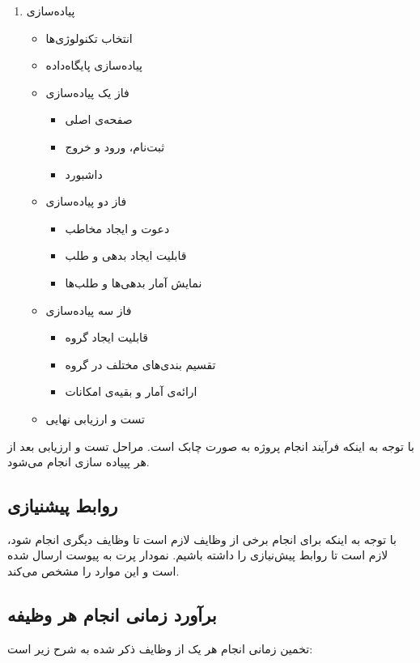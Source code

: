 \begin{enumerate}
\begin{itemize}
	\end{itemize}
	\item
	پیاده‌سازی
	\begin{itemize}
		\item
		انتخاب تکنولوژی‌ها
		\item
		پیاده‌سازی پایگاه‌داده
		\item
		فاز یک پیاده‌سازی
		\begin{itemize}
			\item
			صفحه‌ی اصلی
			\item
			ثبت‌نام، ورود و خروج
			\item
			داشبورد
		\end{itemize}
		\item
		فاز دو پیاده‌سازی
		\begin{itemize}
		    \item
		    دعوت و ایجاد مخاطب
		    \item
		    قابلیت ایجاد بدهی و طلب
			\item
			نمایش آمار بدهی‌ها و طلب‌ها
		\end{itemize}
		\item
		فاز سه پیاده‌سازی
		\begin{itemize}
			\item
			قابلیت ایجاد گروه
			\item
			تقسیم بندی‌های مختلف در گروه
			\item
			ارائه‌ی آمار و بقیه‌ی امکانات
		\end{itemize}
		
		\item 
		تست و ارزیابی نهایی
		
	\end{itemize}
\end{enumerate}

با توجه به اینکه فرآیند انجام پروژه به صورت چابک است. مراحل تست و ارزیابی بعد از هر پپیاده سازی انجام می‌شود.


\subsection{روابط پیشنیازی}

با توجه به اینکه برای انجام برخی از وظایف لازم است تا وظایف دیگری انجام شود، لازم است تا روابط پیش‌نیازی را داشته باشیم.  نمودار پرت
به پیوست ارسال شده است و این موارد را مشخص می‌کند.

\subsection{برآورد زمانی انجام هر وظیفه}
تخمین زمانی انجام هر یک از وظایف ذکر شده به شرح زیر است:


